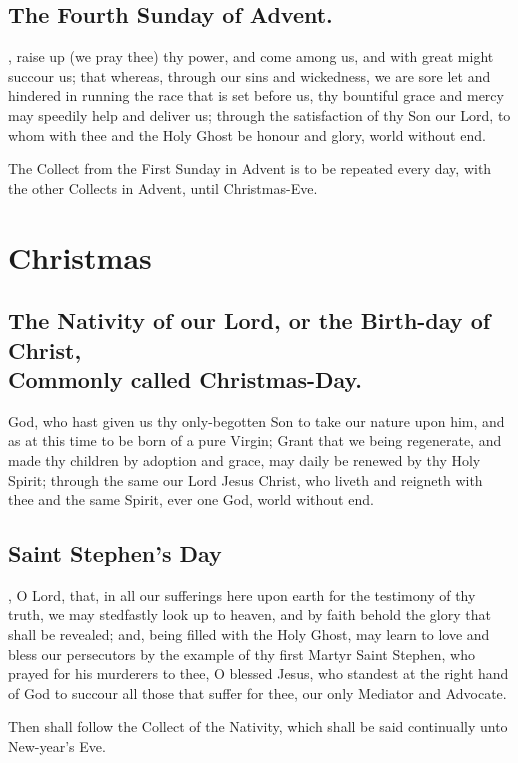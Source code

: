 \subsection{The Fourth Sunday of Advent.}
, raise up (we pray thee) thy power, and come among us, and with great might succour us; that whereas, through our sins and wickedness, we are sore let and hindered in running the race that is set before us, thy bountiful grace and mercy may speedily help and deliver us; through the satisfaction of thy Son our Lord, to whom with thee and the Holy Ghost be honour and glory, world without end.
\begin{secrubric}
The Collect from the First Sunday in Advent is to be repeated every day, with the other Collects in Advent, until Christmas-Eve.
\end{secrubric}

\section{Christmas}

\subsection{The Nativity of our Lord, or the Birth-day of Christ,\\
Commonly called Christmas-Day.}
 God, who hast given us thy only-begotten Son to take our nature upon him, and as at this time to be born of a pure Virgin; Grant that we being regenerate, and made thy children by adoption and grace, may daily be renewed by thy Holy Spirit; through the same our Lord Jesus Christ, who liveth and reigneth with thee and the same Spirit, ever one God, world without end.

\subsection{Saint Stephen's Day}
, O Lord, that, in all our sufferings here upon earth for the testimony of thy truth, we may stedfastly look up to heaven, and by faith behold the glory that shall be revealed; and, being filled with the Holy Ghost, may learn to love and bless our persecutors by the example of thy first Martyr Saint Stephen, who prayed for his murderers to thee, O blessed Jesus, who standest at the right hand of God to succour all those that suffer for thee, our only Mediator and Advocate.
\begin{secrubric}
Then shall follow the Collect of the Nativity, which shall be said continually unto New-year's Eve.
\end{secrubric}

